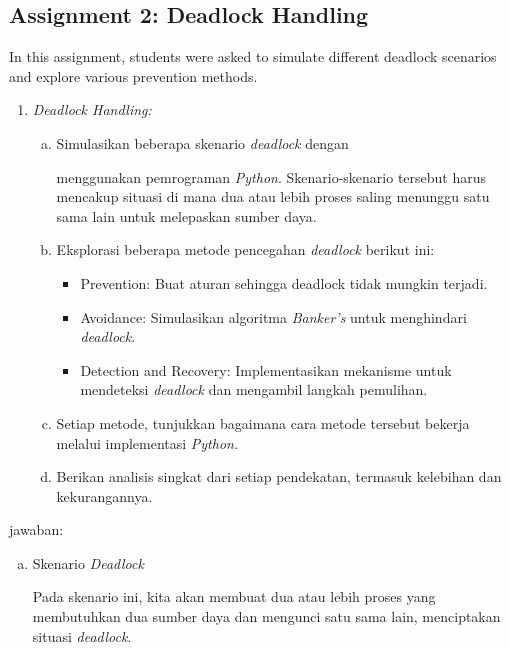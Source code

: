 \documentclass[12pt]{article}
\begin{document}
\subsection{Assignment 2: Deadlock Handling}
In this assignment, students were asked to simulate different deadlock scenarios and explore various prevention methods.

\begin{enumerate}
    \item \textit{ Deadlock Handling:}

    \begin{enumerate}[a.]
    \item Simulasikan beberapa skenario \textit{deadlock} dengan

    menggunakan pemrograman \textit{Python}. Skenario-skenario tersebut harus mencakup situasi di mana dua atau lebih proses saling menunggu satu sama lain untuk melepaskan sumber daya.

    \item Eksplorasi beberapa metode pencegahan \textit{deadlock} berikut ini:
    \begin{itemize}
        \item  {Prevention}: Buat aturan sehingga deadlock tidak mungkin terjadi.
        \item {Avoidance}: Simulasikan algoritma \textit{Banker's} untuk menghindari \textit{deadlock}.
        \item {Detection and Recovery}: Implementasikan mekanisme untuk mendeteksi \textit{deadlock} dan mengambil langkah pemulihan.
    \end{itemize}

   \item Setiap metode, tunjukkan bagaimana cara metode tersebut bekerja melalui implementasi \textit{Python.}

   \item 	Berikan analisis singkat dari setiap pendekatan, termasuk kelebihan dan kekurangannya.
\end{enumerate}

\end{enumerate}


jawaban:

\begin{enumerate}[b.]
    \item Skenario \textit{Deadlock}

    Pada skenario ini, kita akan membuat dua atau lebih proses yang membutuhkan dua sumber daya dan mengunci satu sama lain, menciptakan situasi \textit{deadlock}.
\end{enumerate}
\end{document}

